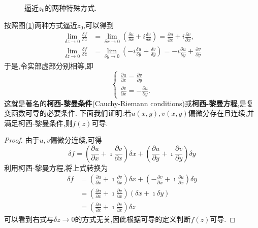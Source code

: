 \begin{figure}
    \centering
    
    \caption{逼近$z_0$的两种特殊方式.}
    \label{fig:limits}
\end{figure}
按照图(\ref{fig:limits})两种方式逼近$z_0$,可以得到
\begin{align}
    \lim _{\delta z \rightarrow 0} \frac{\delta f}{\delta z} &=\lim _{\delta x \rightarrow 0}\left(\frac{\delta u}{\delta x}+i \frac{\delta v}{\delta x}\right)=\frac{\partial u}{\partial x}+i \frac{\partial v}{\partial x},
\\
    \lim _{\delta z \rightarrow 0} \frac{\delta f}{\delta z} &=\lim _{\delta y \rightarrow 0}\left(-i \frac{\delta u}{\delta y}+\frac{\delta v}{\delta y}\right)=-i \frac{\partial u}{\partial y}+\frac{\partial v}{\partial y}
\end{align}
于是,令实部虚部分别相等,即
\begin{equation}
    \begin{cases}
        \frac{\partial u}{\partial x}=\frac{\partial v}{\partial y} \\
        \frac{\partial v}{\partial x}=-\frac{\partial u}{\partial y} .
    \end{cases}
\end{equation}
这就是著名的{\bf 柯西-黎曼条件}(Cauchy-Riemann conditions)或{\bf 柯西-黎曼方程},是复变函数可导的必要条件.
下面我们证明:若$u(x,y), v(x,y)$偏微分存在且连续,并满足柯西-黎曼条件,则$f(z)$可导.
\begin{proof}
    由于$u,v$偏微分连续,可得
    \begin{equation*}
        \delta f=\left(\frac{\partial u}{\partial x}+\imath \frac{\partial v}{\partial x}\right) \delta x+\left(\frac{\partial u}{\partial y}+ \imath \frac{\partial v}{\partial y}\right) \delta y
    \end{equation*}
    利用柯西-黎曼方程,将上式转换为
    \begin{equation*}
        \begin{aligned}
        \delta f & =\left(\frac{\partial u}{\partial x}+ \imath \frac{\partial v}{\partial x}\right) \delta x+\left(-\frac{\partial v}{\partial x}+ \imath\frac{\partial u}{\partial x}\right) \delta y \\
        & =\left(\frac{\partial u}{\partial x}+ \imath \frac{\partial v}{\partial x}\right)(\delta x+ \imath \delta y) 
        \\
        & = \left(\frac{\partial u}{\partial x}+ \imath \frac{\partial v}{\partial x}\right) \delta z
        \end{aligned}
    \end{equation*}
可以看到右式与$\delta z\to 0$的方式无关,因此根据可导的定义判断$f(z)$可导.
\end{proof}
